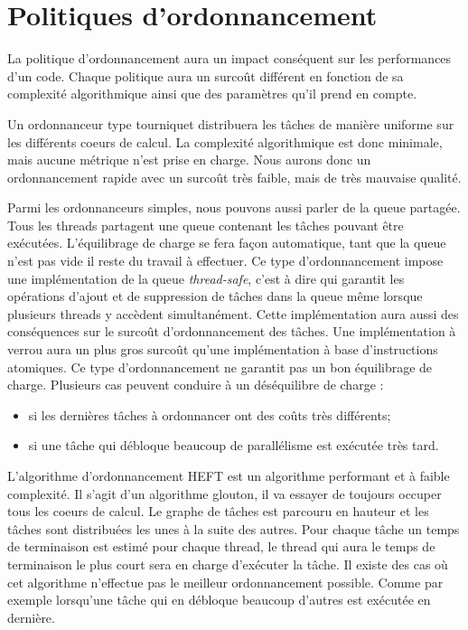 \section{Politiques d'ordonnancement}
La politique d'ordonnancement aura un impact conséquent sur les performances d'un code.
%
Chaque politique aura un surcoût différent en fonction de sa complexité algorithmique ainsi que des paramètres qu'il prend en compte.

Un ordonnanceur type tourniquet distribuera les tâches de manière uniforme sur les différents coeurs de calcul.
%
La complexité algorithmique est donc minimale, mais aucune métrique n'est prise en charge.
%
Nous aurons donc un ordonnancement rapide avec un surcoût très faible, mais de très mauvaise qualité.

Parmi les ordonnanceurs simples, nous pouvons aussi parler de la queue partagée.
%
Tous les threads partagent une queue contenant les tâches pouvant être exécutées.
%
L'équilibrage de charge se fera façon automatique, tant que la queue n'est pas vide il reste du travail à effectuer.
%
Ce type d'ordonnancement impose une implémentation de la queue {\em thread-safe}, c'est à dire qui garantit les opérations d'ajout et de suppression de tâches dans la queue même lorsque plusieurs threads y accèdent simultanément.
%
Cette implémentation aura aussi des conséquences sur le surcoût d'ordonnancement des tâches.
%
Une implémentation à verrou aura un plus gros surcoût qu'une implémentation à base d'instructions atomiques.
%
Ce type d'ordonnancement ne garantit pas un bon équilibrage de charge.
%
Plusieurs cas peuvent conduire à un déséquilibre de charge :
\begin{itemize}
  \item si les dernières tâches à ordonnancer ont des coûts très différents;
  \item si une tâche qui débloque beaucoup de parallélisme est exécutée très tard.
\end{itemize}

L'algorithme d'ordonnancement HEFT est un algorithme performant et à faible complexité\cite{heft2}.
%
Il s'agit d'un algorithme glouton, il va essayer de toujours occuper tous les coeurs de calcul.
%
Le graphe de tâches est parcouru en hauteur et les tâches sont distribuées les unes à la suite des autres.
%
Pour chaque tâche un temps de terminaison est estimé pour chaque thread, le thread qui aura le temps de terminaison le plus court sera en charge d'exécuter la tâche.
%
Il existe des cas où cet algorithme n'effectue pas le meilleur ordonnancement possible.
%
Comme par exemple lorsqu'une tâche qui en débloque beaucoup d'autres est exécutée en dernière.
